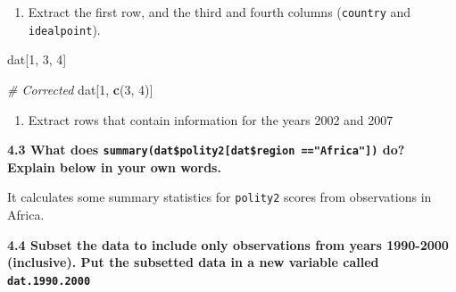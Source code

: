 \documentclass[]{book}
\newenvironment{Shaded}{\begin{snugshade}}{\end{snugshade}}
\newcommand{\CommentTok}[1]{\textcolor[rgb]{0.56,0.35,0.01}{\textit{#1}}}
\newcommand{\DecValTok}[1]{\textcolor[rgb]{0.00,0.00,0.81}{#1}}
\newcommand{\FloatTok}[1]{\textcolor[rgb]{0.00,0.00,0.81}{#1}}
\newcommand{\KeywordTok}[1]{\textcolor[rgb]{0.13,0.29,0.53}{\textbf{#1}}}
\newcommand{\NormalTok}[1]{#1}
\newcommand{\OperatorTok}[1]{\textcolor[rgb]{0.81,0.36,0.00}{\textbf{#1}}}
\newcommand{\StringTok}[1]{\textcolor[rgb]{0.31,0.60,0.02}{#1}}
\providecommand{\tightlist}{%
  \setlength{\itemsep}{0pt}\setlength{\parskip}{0pt}}
\begin{document}
\begin{enumerate}
\def\labelenumi{\arabic{enumi}.}
\setcounter{enumi}{3}
\tightlist
\item
  Extract the first row, and the third and fourth columns
  (\texttt{country} and \texttt{idealpoint}).
\end{enumerate}

\begin{Shaded}
\begin{Highlighting}[]
\NormalTok{dat[}\DecValTok{1}\NormalTok{, }\DecValTok{3}\NormalTok{, }\DecValTok{4}\NormalTok{]}

\CommentTok{# Corrected}
\NormalTok{dat[}\DecValTok{1}\NormalTok{, }\KeywordTok{c}\NormalTok{(}\DecValTok{3}\NormalTok{, }\DecValTok{4}\NormalTok{)]}
\end{Highlighting}
\end{Shaded}

\begin{enumerate}
\def\labelenumi{\arabic{enumi}.}
\setcounter{enumi}{4}
\tightlist
\item
  Extract rows that contain information for the years 2002
  and 2007
\end{enumerate}

\begin{Shaded}
\end{Shaded}

\textbf{4.3 What does \texttt{summary(dat\$polity2{[}dat\$region\ =="Africa"{]})} do? Explain below in your own words.}

It calculates some summary statistics for \texttt{polity2} scores from observations in Africa.

\textbf{4.4 Subset the data to include only observations from years 1990-2000 (inclusive). Put the subsetted data in a new variable called \texttt{dat.1990.2000}}

\begin{Shaded}
\end{Shaded}
\end{document}
